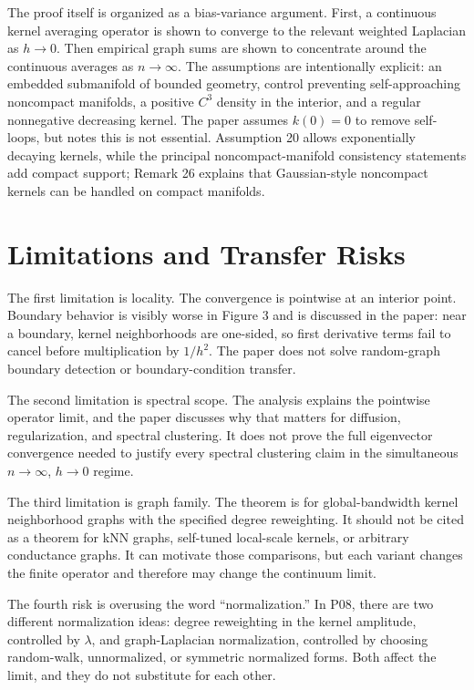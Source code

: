 \documentclass[11pt]{article}
\begin{document}
The proof itself is organized as a bias-variance argument.  First, a
continuous kernel averaging operator is shown to converge to the relevant
weighted Laplacian as $h\to 0$.  Then empirical graph sums are shown to
concentrate around the continuous averages as $n\to\infty$.  The assumptions
are intentionally explicit: an embedded submanifold of bounded geometry,
control preventing self-approaching noncompact manifolds, a positive $C^3$
density in the interior, and a regular nonnegative decreasing kernel.  The
paper assumes $k(0)=0$ to remove self-loops, but notes this is not essential.
Assumption 20 allows exponentially decaying kernels, while the principal
noncompact-manifold consistency statements add compact support; Remark 26
explains that Gaussian-style noncompact kernels can be handled on compact
manifolds.

\section{Limitations and Transfer Risks}

The first limitation is locality.  The convergence is pointwise at an interior
point.  Boundary behavior is visibly worse in Figure 3 and is discussed in
the paper: near a boundary, kernel neighborhoods are one-sided, so first
derivative terms fail to cancel before multiplication by $1/h^2$.  The paper
does not solve random-graph boundary detection or boundary-condition
transfer.

The second limitation is spectral scope.  The analysis explains the pointwise
operator limit, and the paper discusses why that matters for diffusion,
regularization, and spectral clustering.  It does not prove the full
eigenvector convergence needed to justify every spectral clustering claim in
the simultaneous $n\to\infty$, $h\to 0$ regime.

The third limitation is graph family.  The theorem is for global-bandwidth
kernel neighborhood graphs with the specified degree reweighting.  It should
not be cited as a theorem for kNN graphs, self-tuned local-scale kernels, or
arbitrary conductance graphs.  It can motivate those comparisons, but each
variant changes the finite operator and therefore may change the continuum
limit.

The fourth risk is overusing the word ``normalization.''  In P08, there are
two different normalization ideas: degree reweighting in the kernel
amplitude, controlled by $\lambda$, and graph-Laplacian normalization,
controlled by choosing random-walk, unnormalized, or symmetric normalized
forms.  Both affect the limit, and they do not substitute for each other.
\end{document}
